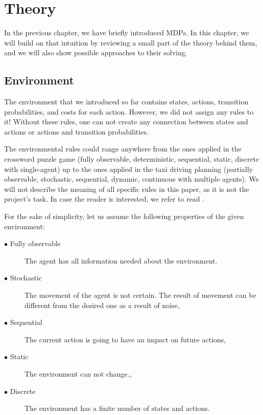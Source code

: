 
\chapter{Theory}

In the previous chapter, we have briefly introduced MDPs. In this chapter, we will build on that intuition by reviewing a small part of the theory behind them, and we will also show possible approaches to their solving.

\section{Environment}
The environment that we introduced so far contains states, actions, transition probabilities, and costs for each action. However, we did not assign any rules to it! 
Without these rules, one can not create any connection between states and actions or actions and transition probabilities.

The environmental rules could range anywhere from the ones applied in the crossword puzzle game (fully observable, deterministic, sequential, static, discrete with single-agent) up to the ones applied in the taxi driving planning (partially observable, stochastic, sequential, dynamic, continuous with multiple agents). We will not describe the meaning of all specific rules in this paper, as it is not the project's task. In case the reader is interested, we refer to read  \cite{russel2010}.

\newpage


For the sake of simplicity, let us assume the following properties of the given environment:
\begin{description}
  \item[$\bullet$ Fully observable] The agent has all information needed about the environment.
  \item[$\bullet$ Stochastic] The movement of the agent is not certain. The result of movement can be different from the desired one as a result of noise,
  \item[$\bullet$ Sequential] The current action is going to have an impact on future actions,
  \item[$\bullet$ Static] The environment can not change.,
  \item[$\bullet$ Discrete] The environment has a finite number of states and actions.
\end{description}



